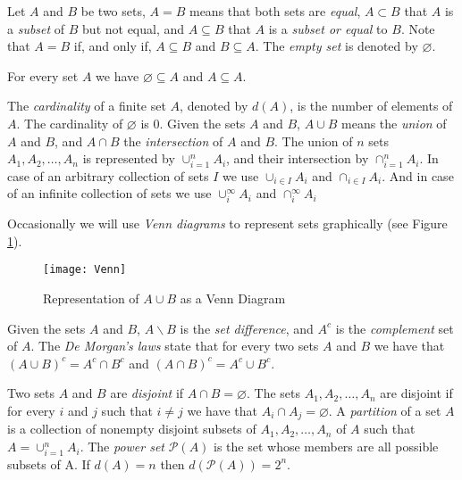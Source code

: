 Let $A$ and $B$ be two sets, $A = B$ means that both sets are \emph{equal}, $A \subset B$ that $A$ is a \emph{subset} of $B$ but not equal, and $A \subseteq B$ that $A$ is a \emph{subset or equal} to $B$. Note that $A = B$ if, and only if, $A \subseteq B$ and $B \subseteq A$. The \emph{empty set} is denoted by $\varnothing$.

\begin{example}
For every set $A$ we have $\varnothing \subseteq A$ and $ A \subseteq A$.
\end{example}

The \emph{cardinality} of a finite set $A$, denoted by $d(A)$, is the number of elements of $A$. The cardinality of $\varnothing$ is 0. Given the sets $A$ and $B$, $A \cup B$ means the \emph{union} of $A$ and $B$, and $A \cap B$ the \emph{intersection} of $A$ and $B$. The union of $n$ sets $A_1, A_2, \ldots, A_n$ is represented by $\cup_{i=1}^n A_i$, and their intersection by $\cap_{i=1}^n A_i$. In case of an arbitrary collection of sets $I$ we use $\cup_{i \in I} A_i$ and $\cap_{i \in I} A_i$. And in case of an infinite collection of sets we use $\cup_{i}^{\infty} A_i$ and $\cap_{i}^{\infty} A_i$

Occasionally we will use \emph{Venn diagrams} to represent sets graphically (see Figure \ref{fig:Venn-diagram}).

\begin{figure}[h]
\centering\texttt{[image: Venn]}
\caption{\label{fig:Venn-diagram}Representation of $A \cup B$ as a Venn Diagram}
\end{figure}

Given the sets $A$ and $B$, $A \backslash B$ is the \emph{set difference}, and ${A}^c$ is the \emph{complement} set of $A$. The \emph{De Morgan's laws} state that for every two sets $A$ and $B$ we have that $\left( A \cup B \right)^c = A^c \cap B^c$ and $\left( A \cap B \right)^c = A^c \cup B^c$.

Two sets $A$ and $B$ are \emph{disjoint} if $A \cap B = \varnothing$. The sets $A_1, A_2, \ldots, A_n$ are disjoint if for every $i$ and $j$ such that $i \neq j$ we have that $A_i \cap A_j = \varnothing$. A \emph{partition} of a set $A$ is a collection of nonempty disjoint subsets of $A_1, A_2, \dots, A_n$ of $A$ such that  $A = \cup_{i=1}^n A_i$. The \emph{power set} $\mathcal{P}(A)$ is the set whose members are all possible subsets of A. If $d(A)=n$ then $d\left( \mathcal{P}(A) \right) = 2^n$.


